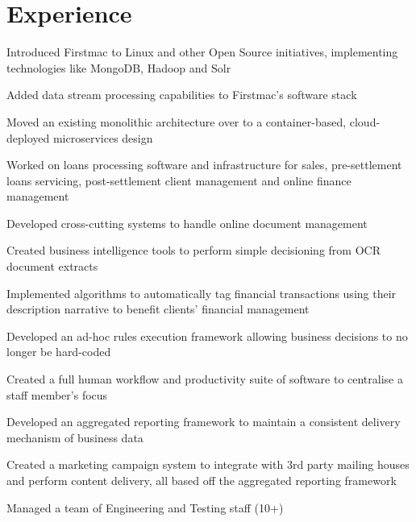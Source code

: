 \documentclass[letterpaper]{deedy-resume} %
\begin{document}
\begin{minipage}[t]{0.66\textwidth} %


\section{Experience}


\vspace{\topsep} %
\begin{tightitemize}
\item Introduced Firstmac to Linux and other Open Source initiatives, implementing technologies like MongoDB, Hadoop and Solr
\item Added data stream processing capabilities to Firstmac's software stack
\item Moved an existing monolithic architecture over to a container-based, cloud-deployed microservices design
\item Worked on loans processing software and infrastructure for sales, pre-settlement loans servicing, post-settlement client management and online finance management
\item Developed cross-cutting systems to handle online document management 
\item Created business intelligence tools to perform simple decisioning from OCR document extracts
\item Implemented algorithms to automatically tag financial transactions using their description narrative to benefit clients' financial management
\item Developed an ad-hoc rules execution framework allowing business decisions to no longer be hard-coded
\item Created a full human workflow and productivity suite of software to centralise a staff member's focus 
\item Developed an aggregated reporting framework to maintain a consistent delivery mechanism of business data 
\item Created a marketing campaign system to integrate with 3rd party mailing houses and perform content delivery, all based off the aggregated reporting framework
\item Managed a team of Engineering and Testing staff (10+)
\end{tightitemize}


\end{minipage}
\end{document}
